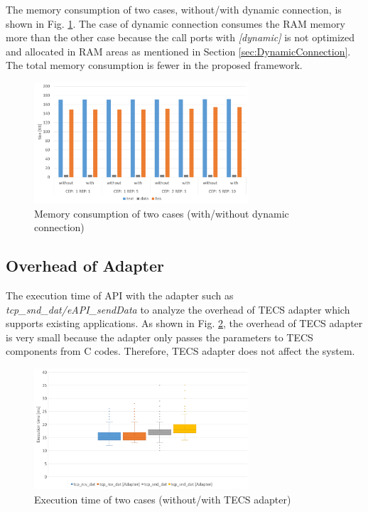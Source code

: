 \documentclass[conference]{IEEEtran/IEEEtran}
\begin{document}
The memory consumption of two cases, without/with dynamic connection, is shown in Fig. \ref{fig:EvaluationOfDynamicConnection}.
The case of dynamic connection consumes the RAM memory more than the other case because the call ports with {\it [dynamic]} is not optimized and allocated in RAM areas as mentioned in Section \ref{sec:DynamicConnection}.
The total memory consumption is fewer in the proposed framework.

\begin{figure}[t]
    \centering
    \includegraphics[width=8.0cm,clip]{figure/EvaluationOfDynamicConnection.pdf}
    \caption{Memory consumption of two cases (with/without dynamic connection)}
    \label{fig:EvaluationOfDynamicConnection}
\end{figure}

\subsection{Overhead of Adapter}

The execution time of API with the adapter such as {\it tcp\_snd\_dat/eAPI\_sendData} to analyze the overhead of TECS adapter which supports existing applications.
As shown in Fig. \ref{fig:EvaluationOfAdapter}, the overhead of TECS adapter is very small because the adapter only passes the parameters to TECS components from C codes.
Therefore, TECS adapter does not affect the system.

\begin{figure}[t]
    \centering
    \includegraphics[width=8.0cm,clip]{figure/EvaluationOfAdapter.pdf}
    \caption{Execution time of two cases (without/with TECS adapter)}
    \label{fig:EvaluationOfAdapter}
\end{figure}
\end{document}
